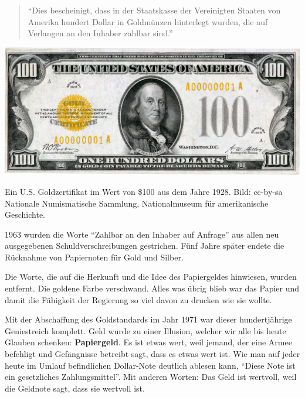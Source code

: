 \begin{quotation}\begin{samepage}
\enquote{Dies bescheinigt, dass in der Staatskasse der Vereinigten Staaten von
Amerika hundert Dollar in Goldmünzen hinterlegt wurden, die auf Verlangen an den
Inhaber zahlbar sind.}
\end{samepage}\end{quotation}

\begin{center}
  \centering
  \includegraphics[width=\textwidth]{assets/images/us-gold-cert-100-smaller.png}
  \caption{Ein U.S. Goldzertifikat im Wert von \$100 aus dem Jahre 1928. Bild:
  cc-by-sa Nationale Numismatische Sammlung, Nationalmuseum für amerikanische
  Geschichte.}
  \label{fig:us-gold-cert-100-smaller}
\end{center}

1963 wurden die Worte \enquote{Zahlbar an den Inhaber auf Anfrage} aus allen neu
ausgegebenen Schuldverschreibungen gestrichen. Fünf Jahre später endete die
Rücknahme von Papiernoten für Gold und Silber.

Die Worte, die auf die Herkunft und die Idee des Papiergeldes hinwiesen, wurden
entfernt. Die goldene Farbe verschwand. Alles was übrig blieb war das Papier und
damit die Fähigkeit der Regierung so viel davon zu drucken wie sie wollte.

Mit der Abschaffung des Goldstandards im Jahr 1971 war dieser hundertjährige
Geniestreich komplett. Geld wurde zu einer Illusion, welcher wir alle bis heute
Glauben schenken: \textbf{Papiergeld}. Es ist etwas wert, weil jemand, der
eine Armee befehligt und Gefängnisse betreibt sagt, dass es etwas wert ist. Wie
man auf jeder heute im Umlauf befindlichen Dollar-Note deutlich ablesen kann,
\enquote{Diese Note ist ein gesetzliches Zahlungsmittel}. Mit anderen Worten:
Das Geld ist wertvoll, weil die Geldnote sagt, dass sie wertvoll ist.

